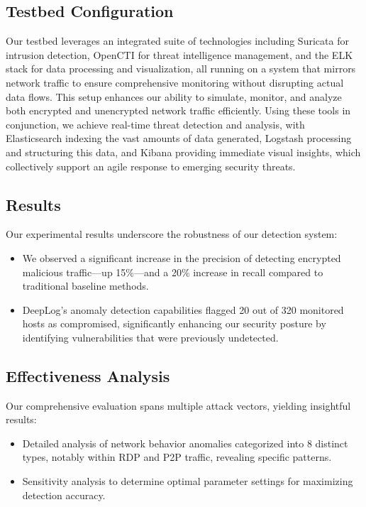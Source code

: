 \subsection{Testbed Configuration}\label{sec:testbed}
Our testbed leverages an integrated suite of technologies including Suricata for intrusion detection, OpenCTI for threat intelligence management, and the ELK stack for data processing and visualization, all running on a system that mirrors network traffic to ensure comprehensive monitoring without disrupting actual data flows. This setup enhances our ability to simulate, monitor, and analyze both encrypted and unencrypted network traffic efficiently. Using these tools in conjunction, we achieve real-time threat detection and analysis, with Elasticsearch indexing the vast amounts of data generated, Logstash processing and structuring this data, and Kibana providing immediate visual insights, which collectively support an agile response to emerging security threats.


\subsection{Results}\label{sec:results}
Our experimental results underscore the robustness of our detection system:
\begin{itemize}
    \item We observed a significant increase in the precision of detecting encrypted malicious traffic—up 15\%—and a 20\% increase in recall compared to traditional baseline methods.
    \item DeepLog's anomaly detection capabilities flagged 20 out of 320 monitored hosts as compromised, significantly enhancing our security posture by identifying vulnerabilities that were previously undetected.
\end{itemize}

\subsection{Effectiveness Analysis}\label{sec:effect}
Our comprehensive evaluation spans multiple attack vectors, yielding insightful results:
\begin{itemize}
    \item Detailed analysis of network behavior anomalies categorized into 8 distinct types, notably within RDP and P2P traffic, revealing specific patterns.
    \item Sensitivity analysis to determine optimal parameter settings for maximizing detection accuracy.
\end{itemize}

